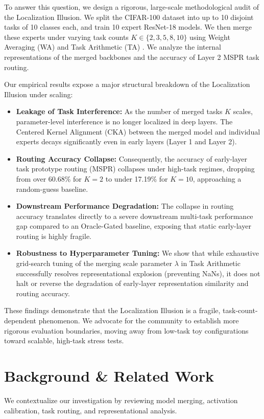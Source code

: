 \documentclass{article}
\theoremstyle{plain}
\theoremstyle{definition}
\theoremstyle{remark}
\begin{document}
To answer this question, we design a rigorous, large-scale methodological audit of the Localization Illusion. We split the CIFAR-100 dataset into up to 10 disjoint tasks of 10 classes each, and train 10 expert ResNet-18 models. We then merge these experts under varying task counts $K \in \{2, 3, 5, 8, 10\}$ using Weight Averaging (WA) and Task Arithmetic (TA) \cite{sharma24}. We analyze the internal representations of the merged backbones and the accuracy of Layer 2 MSPR task routing.

Our empirical results expose a major structural breakdown of the Localization Illusion under scaling:
\begin{itemize}
    \item \textbf{Leakage of Task Interference:} As the number of merged tasks $K$ scales, parameter-level interference is no longer localized in deep layers. The Centered Kernel Alignment (CKA) between the merged model and individual experts decays significantly even in early layers (Layer 1 and Layer 2).
    \item \textbf{Routing Accuracy Collapse:} Consequently, the accuracy of early-layer task prototype routing (MSPR) collapses under high-task regimes, dropping from over 60.68\% for $K=2$ to under 17.19\% for $K=10$, approaching a random-guess baseline.
    \item \textbf{Downstream Performance Degradation:} The collapse in routing accuracy translates directly to a severe downstream multi-task performance gap compared to an Oracle-Gated baseline, exposing that static early-layer routing is highly fragile.
    \item \textbf{Robustness to Hyperparameter Tuning:} We show that while exhaustive grid-search tuning of the merging scale parameter $\lambda$ in Task Arithmetic successfully resolves representational explosion (preventing NaNs), it does not halt or reverse the degradation of early-layer representation similarity and routing accuracy.
\end{itemize}

These findings demonstrate that the Localization Illusion is a fragile, task-count-dependent phenomenon. We advocate for the community to establish more rigorous evaluation boundaries, moving away from low-task toy configurations toward scalable, high-task stress tests.

\section{Background \& Related Work}
We contextualize our investigation by reviewing model merging, activation calibration, task routing, and representational analysis.
\end{document}
